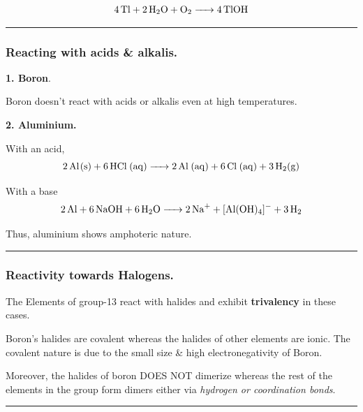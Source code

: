 \documentclass[twocolumn]{article}
\begin{document}
\begin{CJK*}{UTF8}{gbsn}
\[
    \ce{ 4Tl + 2H2O + O2 -> 4TlOH } 
\]

\vspace*{0.2in}

\hrule

\subsubsection*{Reacting with acids \& alkalis.}

\textbf{1. Boron}. 

Boron doesn't react with acids or alkalis even at high temperatures. 

\vspace*{0.1in} 

\noindent 
\textbf{2. Aluminium.}

With an acid,
\[
    \ce{ 2Al(s) + 6HCl (aq) -> 2Al (aq) + 6Cl (aq) + 3H2(g) }
\]

With a base
\[
    \ce{  2Al + 6NaOH + 6H2O -> 2Na+ + [Al(OH)4]- + 3H2}
\]

Thus, aluminium shows amphoteric nature. 

\vspace*{0.1in} 
\hrule

\subsubsection*{Reactivity towards Halogens.}

The Elements of group-13 react with halides and exhibit \textbf{trivalency} in these cases. 

\begin{imp}
    Boron's halides are covalent whereas the halides of other elements are ionic. The covalent nature is due to the small size \& high electronegativity of Boron.
\end{imp}

Moreover, the halides of boron DOES NOT dimerize whereas the rest of the elements in the group form dimers either via \textit{hydrogen or coordination bonds}. 

\vspace*{0.1in} 
\hrule


\end{CJK*}
\end{document}

